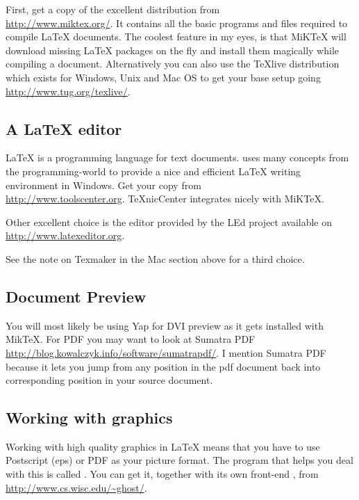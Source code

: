 First, get a copy of the excellent  distribution from\\
\url{http://www.miktex.org/}. It contains all the basic programs and files
required to compile \LaTeX{} documents.  The coolest feature in my eyes, is
that MiKTeX will download missing \LaTeX{} packages on the fly and install them
magically while compiling a document. Alternatively you can also use
the TeXlive distribution which exists for Windows, Unix and Mac OS to
get your base setup going \url{http://www.tug.org/texlive/}.

\subsection{A \LaTeX{} editor}

\LaTeX{} is a programming language for text documents. 
uses many concepts from the programming-world to provide a nice and
efficient \LaTeX{} writing environment in Windows. Get your copy from\\
\url{http://www.toolscenter.org}. TeXnicCenter integrates nicely with
MiKTeX.

Other excellent choice is the editor provided by the LEd project available
on \url{http://www.latexeditor.org}.

See the note on Texmaker in the Mac section above for a third choice.

\subsection{Document Preview}

You will most likely be using Yap for DVI preview as it gets installed with
MikTeX. For PDF you may want to look at Sumatra
PDF \url{http://blog.kowalczyk.info/software/sumatrapdf/}. I mention Sumatra PDF
because it lets you jump from any position in the pdf document back into
corresponding position in your source document.

\subsection{Working with graphics}

Working with high quality graphics in \LaTeX{} means that you have to use
Postscript (eps) or PDF as your picture format. The program that helps you
deal with this is called . You can get it, together with its
own front-end , from \url{http://www.cs.wisc.edu/~ghost/}.

